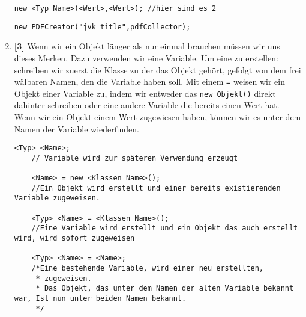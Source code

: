 \begin{enumerate}
\begin{lstlisting}[title=\textbf{Konstruktor Syntax},firstnumber=5]
    new <Typ Name>(<Wert>,<Wert>); //hier sind es 2
    \end{lstlisting}
          \begin{lstlisting}[title=\textbf{Beispiel (1/3) Konstruktor},firstnumber=2,frame=lr]
        new PDFCreator("jvk title",pdfCollector);
    \end{lstlisting}
    \item \textbf{[3]} Wenn wir ein Objekt länger als nur einmal brauchen müssen wir uns dieses Merken. Dazu verwenden wir eine Variable. Um eine zu erstellen: schreiben wir zuerst die Klasse zu der das Objekt gehört, gefolgt von dem frei wälbaren Namen, den die Variable haben soll. Mit einem \lstinline{=} weisen wir ein Objekt einer Variable zu, indem wir entweder das \lstinline{new Objekt()} direkt dahinter schreiben oder eine andere
          Variable die bereits einen Wert hat.
          Wenn wir ein Objekt einem Wert zugewiesen haben, können wir es unter dem Namen der Variable wiederfinden.
          \begin{lstlisting}[title=\textbf{Variablen Syntax}]
    <Typ> <Name>; 
    // Variable wird zur späteren Verwendung erzeugt

    <Name> = new <Klassen Name>(); 
    //Ein Objekt wird erstellt und einer bereits existierenden Variable zugeweisen.

    <Typ> <Name> = <Klassen Name>(); 
    //Eine Variable wird erstellt und ein Objekt das auch erstellt wird, wird sofort zugeweisen

    <Typ> <Name> = <Name>; 
    /*Eine bestehende Variable, wird einer neu erstellten,
     * zugeweisen.
     * Das Objekt, das unter dem Namen der alten Variable bekannt war, Ist nun unter beiden Namen bekannt.
     */


\end{lstlisting}
\end{enumerate}
